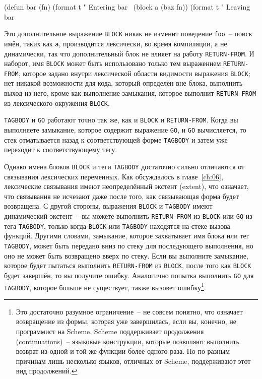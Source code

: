 \begin{myverb}
(defun bar (fn)
  (format t "  Entering bar~%
  (block a (baz fn))
  (format t "  Leaving bar~%
\end{myverb}

Это дополнительное выражение \lstinline{BLOCK} никак не изменит поведение \lstinline{foo}~-- поиск
имён, таких как \lstinline{a}, производится лексически, во время компиляции, а не динамически,
так что дополнительный блок не влияет на работу \lstinline{RETURN-FROM}. И наборот, имя
\lstinline{BLOCK} может быть использовано только тем выражением \lstinline{RETURN-FROM}, которое
задано внутри лексической области видимости выражения \lstinline{BLOCK}; нет никакой
возможности для кода, который определён вне блока, выполнить выход из него, кроме как
выполнение замыкания, которое выполнит \lstinline{RETURN-FROM} из лексического окружения
\lstinline{BLOCK}.

\lstinline{TAGBODY} и \lstinline{GO} работают точно так же, как и \lstinline{BLOCK} и \lstinline{RETURN-FROM}.
Когда вы выполняете замыкание, которое содержит выражение \lstinline{GO}, и \lstinline{GO}
вычисляется, то стек отматывается назад к соответствующей форме \lstinline{TAGBODY} и затем
уже переходит к соответствующему тегу.

Однако имена блоков \lstinline{BLOCK} и теги \lstinline{TAGBODY} достаточно сильно отличаются от
связывания лексических переменных. Как обсуждалось в главе~\ref{ch:06}, лексические
связывания имеют неопределённый экстент (extent), что означает, что связывания не
исчезают даже после того, как связывающая форма будет возвращена. С другой стороны,
выражения \lstinline{BLOCK} и \lstinline{TAGBODY} имеют динамический экстент~-- вы можете выполнить
\lstinline{RETURN-FROM} из \lstinline{BLOCK} или \lstinline{GO} из тега \lstinline{TAGBODY}, только когда
\lstinline{BLOCK} или \lstinline{TAGBODY} находятся на стеке вызова функций. Другими словами,
замыкание, которое захватывает имя блока или тег \lstinline{TAGBODY}, может быть передано вниз
по стеку для последующего выполнения, но оно не может быть возвращено вверх по
стеку. Если вы выполните замыкание, которое будет пытаться выполнить \lstinline{RETURN-FROM} из
\lstinline{BLOCK}, после того как \lstinline{BLOCK} будет завершён, то вы получите
ошибку. Аналогично попытка выполнить \lstinline{GO} для \lstinline{TAGBODY}, которое больше не
существует, также вызовет ошибку\footnote{Это достаточно разумное ограничение~-- не
  совсем понятно, что означает возвращение из формы, которая уже завершилась, если вы,
  конечно, не программист на Scheme. Scheme поддерживает продолжения (continuations)~--
  языковые конструкции, которые позволяют выполнить возврат из одной и той же функции
  более одного раза. Но по разным причинам лишь несколько языков, отличных от Scheme,
  поддерживают этот вид продолжений.}.

